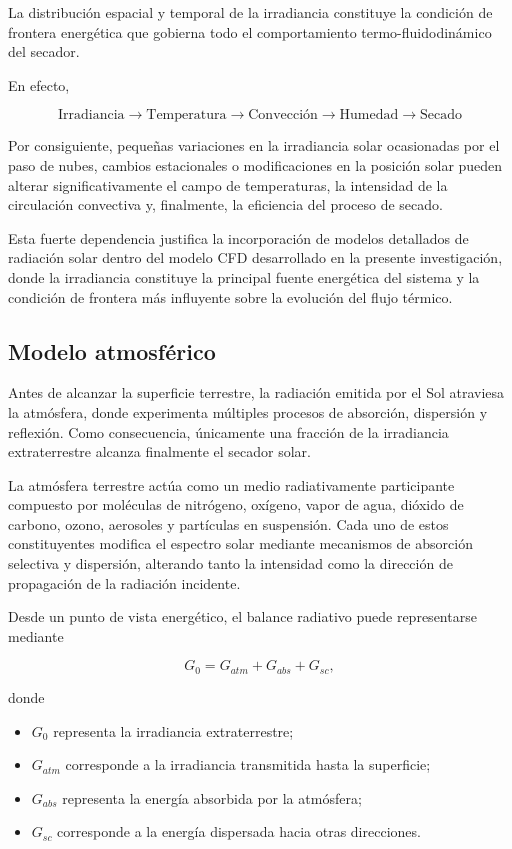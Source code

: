 La distribución espacial y temporal de la irradiancia constituye la condición de frontera energética que gobierna todo el comportamiento termo-fluidodinámico del secador.

En efecto,

\[
\boxed{
\text{Irradiancia}
\rightarrow
\text{Temperatura}
\rightarrow
\text{Convección}
\rightarrow
\text{Humedad}
\rightarrow
\text{Secado}
}
\]

Por consiguiente, pequeñas variaciones en la irradiancia solar ocasionadas por el paso de nubes, cambios estacionales o modificaciones en la posición solar pueden alterar significativamente el campo de temperaturas, la intensidad de la circulación convectiva y, finalmente, la eficiencia del proceso de secado.

Esta fuerte dependencia justifica la incorporación de modelos detallados de radiación solar dentro del modelo CFD desarrollado en la presente investigación, donde la irradiancia constituye la principal fuente energética del sistema y la condición de frontera más influyente sobre la evolución del flujo térmico. 


\subsection{Modelo atmosférico}

Antes de alcanzar la superficie terrestre, la radiación emitida por el Sol atraviesa la atmósfera, donde experimenta múltiples procesos de absorción, dispersión y reflexión. Como consecuencia, únicamente una fracción de la irradiancia extraterrestre alcanza finalmente el secador solar.

La atmósfera terrestre actúa como un medio radiativamente participante compuesto por moléculas de nitrógeno, oxígeno, vapor de agua, dióxido de carbono, ozono, aerosoles y partículas en suspensión. Cada uno de estos constituyentes modifica el espectro solar mediante mecanismos de absorción selectiva y dispersión, alterando tanto la intensidad como la dirección de propagación de la radiación incidente.

Desde un punto de vista energético, el balance radiativo puede representarse mediante

\begin{equation}
G_{0}
=
G_{atm}
+
G_{abs}
+
G_{sc},
\end{equation}

donde

\begin{itemize}
\item $G_0$ representa la irradiancia extraterrestre;
\item $G_{atm}$ corresponde a la irradiancia transmitida hasta la superficie;
\item $G_{abs}$ representa la energía absorbida por la atmósfera;
\item $G_{sc}$ corresponde a la energía dispersada hacia otras direcciones.
\end{itemize}


